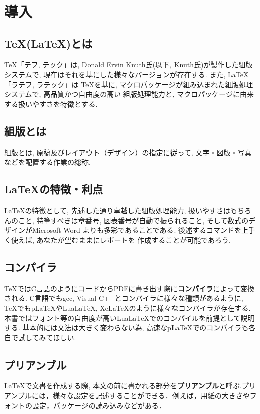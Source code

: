 \section{導入}
\subsection{\TeX(\LaTeX)とは}
\TeX 「テフ, テック」は, Donald Ervin Knuth氏(以下, Knuth氏)が製作した組版システム\cite{W3C2021}で, 
現在はそれを基にした様々なバージョンが存在する. また, \LaTeX 「ラテフ, ラテック」は
\TeX を基に, マクロパッケージが組み込まれた組版処理システムで, 高品質かつ自由度の高い
組版処理能力と, マクロパッケージに由来する扱いやすさを特徴とする. 
\subsection{組版とは}
組版とは, 原稿及びレイアウト（デザイン）の指定に従って, 文字・図版・写真などを配置する作業の総称. 
\subsection{\LaTeX の特徴・利点}
\LaTeX の特徴として, 先述した通り卓越した組版処理能力, 扱いやすさはもちろんのこと, 
特筆すべきは章番号, 図表番号が自動で振られること, そして数式のデザインがMicrosoft Word
よりも多彩であることである. 後述するコマンドを上手く使えば, あなたが望むままにレポートを
作成することが可能であろう. 
\subsection{コンパイラ}
\TeX ではC言語のようにコードからPDFに書き出す際に\textbf{コンパイラ}によって変換される. 
C言語でもgcc, Visual C++とコンパイラに様々な種類があるように, \TeX でもpLaTeXやLuaLaTeX, 
XeLaTeXのように様々なコンパイラが存在する. 
本書ではフォント等の自由度が高いLuaLaTeXでのコンパイルを前提として説明する. 
基本的には文法は大きく変わらない為, 高速なpLaTeXでのコンパイラも各自で試してみてほしい. 
\subsection{プリアンブル}
\LaTeX で文書を作成する際, 本文の前に書かれる部分を\textbf{プリアンブル}と呼ぶ.プリアンブルには，様々な設定を記述することができる．例えば，用紙の大きさやフォントの設定，パッケージの読み込みなどがある．